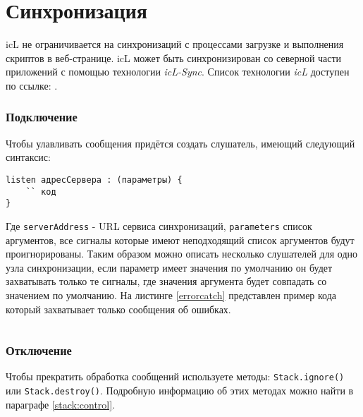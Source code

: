 \section{Синхронизация}
\label{sync}

icL не ограничивается на синхронизаций с процессами загрузке и выполнения скриптов в веб-странице. icL может быть синхронизирован со северной части приложений с помощью технологии \textit{icL-Sync}. Список технологии \textit{icL} доступен по ссылке: .

\subsubsection{Подключение}

Чтобы улавливать сообщения придётся создать слушатель, имеющий следующий синтаксис:
\begin{verbatim}
listen адресСервера : (параметры) {
	`` код
}
\end{verbatim}

Где \texttt{serverAddress} - URL сервиса синхронизаций, \texttt{parameters} список аргументов, все сигналы которые имеют неподходящий список аргументов будут проигнорированы. Таким образом можно описать несколько слушателей для одно узла синхронизации, если параметр имеет значения по умолчанию он будет захватывать только те сигналы, где значения аргумента будет совпадать со значением по умолчанию. На листинге \ref{errorcatch} представлен пример кода который захватывает только сообщения об ошибках.


\begin{sourcecode}
	\label{errorcatch}
    \inputminted[linenos]{icl}{../sources/errorcatch.icL}
\end{sourcecode}

\subsubsection{Отключение}

Чтобы прекратить обработка сообщений используете методы: \texttt{Stack.ignore()} или \texttt{Stack.destroy()}. Подробную информацию об этих методах можно найти в параграфе \ref{stack:control}.